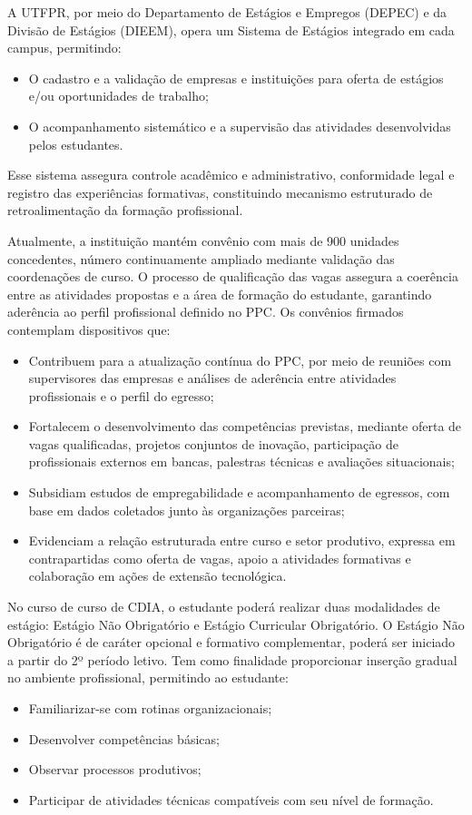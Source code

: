A UTFPR, por meio do Departamento de Estágios e Empregos (DEPEC) e da Divisão de Estágios (DIEEM), opera um Sistema de Estágios integrado em cada campus, permitindo:

\begin{itemize}
    \item O cadastro e a validação de empresas e instituições para oferta de estágios e/ou oportunidades de trabalho;
    \item O acompanhamento sistemático e a supervisão das atividades desenvolvidas pelos estudantes.
\end{itemize}

Esse sistema assegura controle acadêmico e administrativo, conformidade legal e registro das experiências formativas, constituindo mecanismo estruturado de retroalimentação da formação profissional.

Atualmente, a instituição mantém convênio com mais de 900 unidades concedentes, número continuamente ampliado mediante validação das coordenações de curso. O processo de qualificação das vagas assegura a coerência entre as atividades propostas e a área de formação do estudante, garantindo aderência ao perfil profissional definido no PPC. Os convênios firmados contemplam dispositivos que:
\begin{itemize}
    \item Contribuem para a atualização contínua do PPC, por meio de reuniões com supervisores das empresas e análises de aderência entre atividades profissionais e o perfil do egresso;
    \item Fortalecem o desenvolvimento das competências previstas, mediante oferta de vagas qualificadas, projetos conjuntos de inovação, participação de profissionais externos em bancas, palestras técnicas e avaliações situacionais;
    \item Subsidiam estudos de empregabilidade e acompanhamento de egressos, com base em dados coletados junto às organizações parceiras;
    \item Evidenciam a relação estruturada entre curso e setor produtivo, expressa em contrapartidas como oferta de vagas, apoio a atividades formativas e colaboração em ações de extensão tecnológica.
\end{itemize}

No curso de curso de CDIA, o estudante poderá realizar duas modalidades de estágio: Estágio Não Obrigatório e Estágio Curricular Obrigatório.
O Estágio Não Obrigatório é de caráter opcional e formativo complementar, poderá ser iniciado a partir do 2º período letivo. Tem como finalidade proporcionar inserção gradual no ambiente profissional, permitindo ao estudante:
\begin{itemize}
    \item Familiarizar-se com rotinas organizacionais;
    \item Desenvolver competências básicas;
    \item Observar processos produtivos;
    \item Participar de atividades técnicas compatíveis com seu nível de formação.    
\end{itemize}


